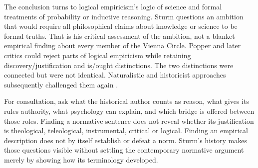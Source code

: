 The conclusion turns to logical empiricism's logic of science and
formal treatments of probability or inductive reasoning. Sturm questions
an ambition that would require all philosophical claims about knowledge
or science to be formal truths. That is his critical assessment of the
ambition, not a blanket empirical finding about every member of the
Vienna Circle. Popper and later critics could reject parts of logical
empiricism while retaining discovery/justification and is/ought
distinctions. The two distinctions were connected but were not identical.
Naturalistic and historicist approaches subsequently challenged them
again \parencite[p.~82]{Sturm2021DescriptiveNormativeHistory}.

For consultation, ask what the historical author counts as reason,
what gives its rules authority, what psychology can explain, and which
bridge is offered between those roles. Finding a normative sentence
does not reveal whether its justification is theological, teleological,
instrumental, critical or logical. Finding an empirical description
does not by itself establish or defeat a norm. Sturm's history makes
those questions visible without settling the contemporary normative
argument merely by showing how its terminology developed.
